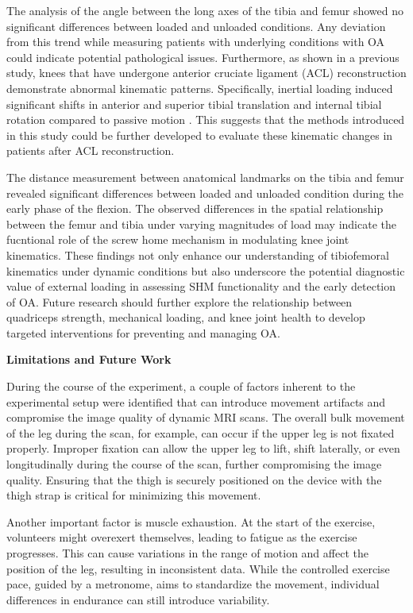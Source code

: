 \documentclass{micro-econ-thesis}
\begin{document}
The analysis of the angle between the long axes of the tibia and femur showed no significant differences between loaded and unloaded conditions. Any deviation from this trend while measuring patients with underlying conditions with OA could indicate potential pathological issues. Furthermore, as shown in a previous study, knees that have undergone anterior cruciate ligament (ACL) reconstruction demonstrate abnormal kinematic patterns. Specifically, inertial loading induced significant shifts in anterior and superior tibial translation and internal tibial rotation compared to passive motion \parencite{kaiser_effect_2017}. This suggests that the methods introduced in this study could be further developed to evaluate these kinematic changes in patients after ACL reconstruction. 

The distance measurement between anatomical landmarks on the tibia and femur revealed significant differences between loaded and unloaded condition during the early phase of the flexion. The observed differences in the spatial relationship between the femur and tibia under varying magnitudes of load may indicate the fucntional role of the screw home mechanism in modulating knee joint kinematics. These findings not only enhance our understanding of tibiofemoral kinematics under dynamic conditions but also underscore the potential diagnostic value of external loading in assessing SHM functionality and the early detection of OA. Future research should further explore the relationship between quadriceps strength, mechanical loading, and knee joint health to develop targeted interventions for preventing and managing OA.



\textbf{Limitations and Future Work}

During the course of the experiment, a couple of factors inherent to the experimental setup were identified that can introduce movement artifacts and compromise the image quality of dynamic MRI scans. The overall bulk movement of the leg during the scan, for example, can occur if the upper leg is not fixated properly. Improper fixation can allow the upper leg to lift, shift laterally, or even longitudinally during the course of the scan, further compromising the image quality. Ensuring that the thigh is securely positioned on the device with the thigh strap is critical for minimizing this movement.

Another important factor is muscle exhaustion. At the start of the exercise, volunteers might overexert themselves, leading to fatigue as the exercise progresses. This can cause variations in the range of motion and affect the position of the leg, resulting in inconsistent data. While the controlled exercise pace, guided by a metronome, aims to standardize the movement, individual differences in endurance can still introduce variability.
\end{document}
